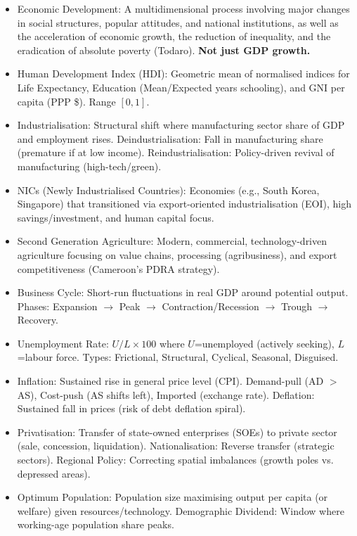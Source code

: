 \documentclass[11pt]{article}
\newcommand{\cle}[1]{{\popxbold\color{popdark}#1}}
\newcounter{popsec}
\newcounter{popsub}
\newcommand{\courssub}[1]{%
  \stepcounter{popsub}%
  \par\vspace{9pt}\noindent{\popxbold\fontsize{11.5}{13}\selectfont\color{popink}{\color{poporange}\thepopsec.\thepopsub}\hspace{6pt}#1}\par\nopagebreak\vspace{4pt}
}
\begin{document}
\begin{bilan}

\courssub{Key Definitions}
\begin{itemize}
    \item \cle{Economic Development}: A multidimensional process involving major changes in social structures, popular attitudes, and national institutions, as well as the acceleration of economic growth, the reduction of inequality, and the eradication of absolute poverty (Todaro). \textbf{Not just GDP growth.}
    \item \cle{Human Development Index (HDI)}: Geometric mean of normalised indices for Life Expectancy, Education (Mean/Expected years schooling), and GNI per capita (PPP \$). Range $[0,1]$.
    \item \cle{Industrialisation}: Structural shift where manufacturing sector share of GDP and employment rises. \cle{Deindustrialisation}: Fall in manufacturing share (premature if at low income). \cle{Reindustrialisation}: Policy-driven revival of manufacturing (high-tech/green).
    \item \cle{NICs (Newly Industrialised Countries)}: Economies (e.g., South Korea, Singapore) that transitioned via export-oriented industrialisation (EOI), high savings/investment, and human capital focus.
    \item \cle{Second Generation Agriculture}: Modern, commercial, technology-driven agriculture focusing on value chains, processing (agribusiness), and export competitiveness (Cameroon's PDRA strategy).
    \item \cle{Business Cycle}: Short-run fluctuations in real GDP around potential output. Phases: Expansion $\to$ Peak $\to$ Contraction/Recession $\to$ Trough $\to$ Recovery.
    \item \cle{Unemployment Rate}: $U/L \times 100$ where $U$=unemployed (actively seeking), $L$=labour force. Types: Frictional, Structural, Cyclical, Seasonal, Disguised.
    \item \cle{Inflation}: Sustained rise in general price level (CPI). \cle{Demand-pull} (AD $>$ AS), \cle{Cost-push} (AS shifts left), \cle{Imported} (exchange rate). \cle{Deflation}: Sustained fall in prices (risk of debt deflation spiral).
    \item \cle{Privatisation}: Transfer of state-owned enterprises (SOEs) to private sector (sale, concession, liquidation). \cle{Nationalisation}: Reverse transfer (strategic sectors). \cle{Regional Policy}: Correcting spatial imbalances (growth poles vs. depressed areas).
    \item \cle{Optimum Population}: Population size maximising output per capita (or welfare) given resources/technology. \cle{Demographic Dividend}: Window where working-age population share peaks.
\end{itemize}


\end{bilan}
\end{document}
